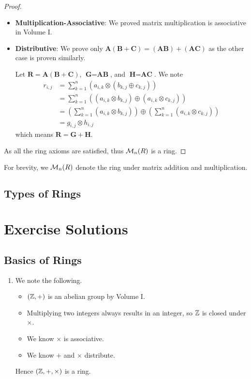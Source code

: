 \begin{proof}
\begin{itemize}
        \item \textbf{Multiplication-Associative}: We proved matrix multiplication is associative in Volume I.
        
        \item \textbf{Distributive}: We prove only $\textbf{A}(\textbf{B} + \textbf{C}) = (\textbf{AB}) + (\textbf{AC})$ as the other case is proven similarly.
        
        Let $\textbf{R} = \textbf{A}(\textbf{B} + \textbf{C})$, $\textbf{G} = \textbf{AB}$, and $\textbf{H} = \textbf{AC}$. We note
        \begin{align*}
            r_{i,j} &= \sum_{k=1}^n \left(a_{i,k} \otimes \left(b_{k,j} \oplus c_{k,j}\right)\right)\\
            &= \sum_{k=1}^n \left((a_{i,k} \otimes b_{k,j}) \oplus (a_{i,k} \otimes c_{k,j})\right)\\
            &= \left(\sum_{k=1}^n (a_{i,k} \otimes b_{k,j})\right) \oplus \left(\sum_{k=1}^n (a_{i,k} \otimes c_{k,j})\right)\\
            &= g_{i,j}\otimes h_{i,j}
        \end{align*}
        which means $\textbf{R} = \textbf{G} + \textbf{H}$.
    \end{itemize}
    As all the ring axioms are satisfied, thus $\mathcal{M}_{n}(R)$ is a ring.
\end{proof}
For brevity, we $\mathcal{M}_{n}(R)$ denote the ring under matrix addition and multiplication.

\newpage

\section{Types of Rings}

\appendix
\chapter{Exercise Solutions}
\section{Basics of Rings}
\begin{enumerate}
    \item We note the following.
    \begin{itemize}
        \item $(\mathbb{Z}, +)$ is an abelian group by Volume I.
        \item Multiplying two integers always results in an integer, so $\mathbb{Z}$ is closed under $\times$.
        \item We know $\times$ is associative.
        \item We know $+$ and $\times$ distribute.
    \end{itemize}
    Hence $(\mathbb{Z}, +, \times)$ is a ring.
\end{enumerate}

